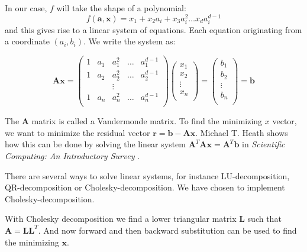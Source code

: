 In our case, $f$ will take the shape of a polynomial:
$$f(\mathbf{a},\mathbf{x}) = x_1 + x_2a_i + x_3a_i^2 \ldots x_da_i^{d-1}$$
and this gives rise to a linear system of equations. Each equation
originating from a coordinate $(a_i, b_i)$. We write the system as:

\begin{equation}
  \label{eq:vandermonde}
  \mathbf{Ax} =
  \left(
  \begin{array}{ccccc}
    1 & a_1 & a_1^2 & \ldots & a_1^{d-1} \\
    1 & a_2 & a_2^2 & \ldots & a_2^{d-1} \\
     & & \vdots & & \\
    1 & a_n & a_n^2 & \ldots & a_n^{d-1} \\
  \end{array}\right)
  \left(
  \begin{array}{c}
     x_1 \\
     x_2 \\
    \vdots \\
     x_n \\
  \end{array}\right)
=
  \left(
  \begin{array}{c}
     b_1 \\
     b_2 \\
    \vdots \\
     b_n \\
  \end{array}\right)
= \mathbf{b}
\end{equation}

The $\mathbf{A}$ matrix is called a Vandermonde matrix.  To find the
minimizing $x$ vector, we want to minimize the residual vector
$\mathbf{r} = \mathbf{b} - \mathbf{Ax}$. Michael T. Heath shows how
this can be done by solving the linear system
$\mathbf{A}^T\mathbf{A}\mathbf{x} = \mathbf{A}^T\mathbf{b}$ in
\emph{Scientific Computing: An Introductory Survey} \cite[Section
3.2.1]{heath2002scicomp}.

There are several ways to solve linear systems, for instance
LU-decomposition, QR-decomposition or Cholesky-decomposition. We have
chosen to implement Cholesky-decomposition.

With Cholesky decomposition we find a lower triangular matrix
$\mathbf{L}$ such that $\mathbf{A} = \mathbf{LL}^T$. And now forward
and then backward substitution can be used to find the minimizing
$\mathbf{x}$.

